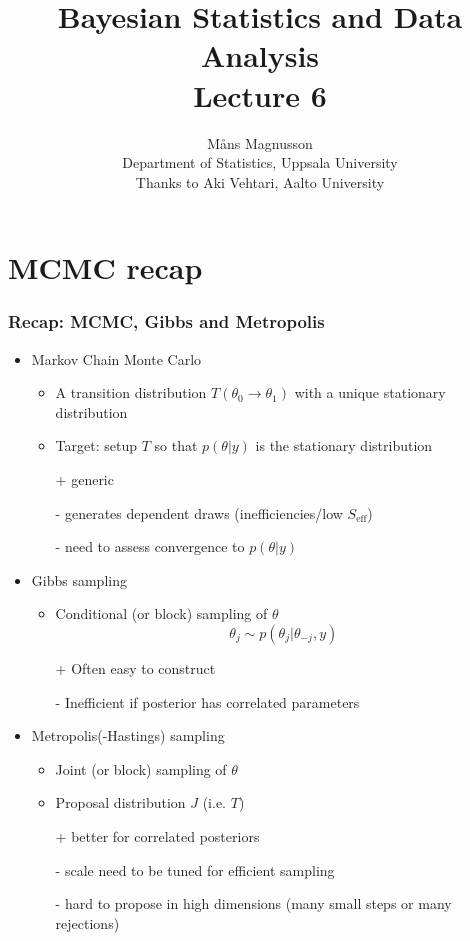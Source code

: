\documentclass[10pt]{beamer}
\title[]{{\color{black}Bayesian Statistics and Data Analysis \\ Lecture 6}}
\author[]{M{\aa}ns Magnusson \\ Department of Statistics, Uppsala University \\ Thanks to Aki Vehtari, Aalto University}
\date{}
\newcommand{\uured}[1]{\textcolor{uured}{#1}}
\begin{document}
\frame{\titlepage
}



\section{MCMC recap}

\begin{frame}
\frametitle{Recap: MCMC, Gibbs and Metropolis}

\begin{itemize}
\item Markov Chain Monte Carlo
\begin{itemize}
\item A \uured{transition distribution} $T(\theta_0 \rightarrow \theta_1)$ with a unique \uured{stationary distribution}
\item Target: setup $T$ so that $p(\theta|y)$ is the stationary distribution\pause
\item [+] generic \pause
\item [-] generates dependent draws (inefficiencies/low $S_\text{eff}$)
\item [-] need to assess convergence to $p(\theta|y)$
\end{itemize}
\pause
\item Gibbs sampling
\begin{itemize}
\item Conditional (or block) sampling of $\theta$
\[
\theta_j \sim p(\theta_j|\theta_{-j}, y)
\]
\pause
\item[+] Often easy to construct \pause
\item[-] Inefficient if posterior has correlated parameters
\end{itemize}
\pause
\item Metropolis(-Hastings) sampling
\begin{itemize}
\item Joint (or block) sampling of $\theta$
\item Proposal distribution $J$ (i.e. $T$)\pause
\item[+] better for correlated posteriors\pause
\item[-] scale need to be tuned for efficient sampling
\item[-] hard to propose in high dimensions (many small steps or many rejections)
\end{itemize}
\end{itemize}

\end{frame}
\end{document}
